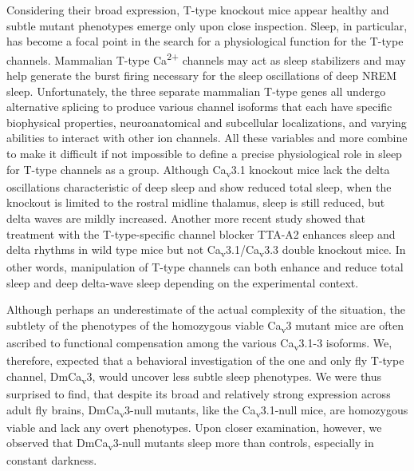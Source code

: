 Considering their broad expression, T-type knockout mice appear healthy and subtle mutant phenotypes emerge only upon close inspection.
Sleep, in particular, has become a focal point in the search for a physiological function for the T-type channels.
Mammalian T-type Ca\textsuperscript{2+} channels may act as sleep stabilizers and may help generate the burst firing necessary for the sleep oscillations of deep NREM sleep.
Unfortunately, the three separate mammalian T-type genes all undergo alternative splicing to produce various channel isoforms that each have specific biophysical properties, neuroanatomical and subcellular localizations, and varying abilities to interact with other ion channels.
All these variables and more combine to make it difficult if not impossible to define a precise physiological role in sleep for T-type channels as a group.
Although Ca\textsubscript{v}3.1 knockout mice lack the delta oscillations characteristic of deep sleep and show reduced total sleep\cite{Lee:2004ey}, when the knockout is limited to the rostral midline thalamus, sleep is still reduced, but delta waves are mildly increased\cite{anderson:2005aa}. Another more recent study showed that treatment with the T-type-specific channel blocker TTA-A2 enhances sleep and delta rhythms in wild type mice but not Ca\textsubscript{v}3.1/Ca\textsubscript{v}3.3 double knockout mice\cite{kraus:2010aa}. In other words, manipulation of T-type channels can both enhance and reduce total sleep and deep delta-wave sleep depending on the experimental context.

Although perhaps an underestimate of the actual complexity of the situation, the subtlety of the phenotypes of the homozygous viable Ca\textsubscript{v}3 mutant mice are often ascribed to functional compensation among the various Ca\textsubscript{v}3.1-3 isoforms\cite{senatore:2012aa}.
We, therefore, expected that a behavioral investigation of the one and only fly T-type channel, DmCa\textsubscript{v}3, would uncover less subtle sleep phenotypes.
We were thus surprised to find, that despite its broad and relatively strong expression across adult fly brains, DmCa\textsubscript{v}3-null mutants, like the Ca\textsubscript{v}3.1-null mice, are homozygous viable and lack any overt phenotypes.
Upon closer examination, however, we observed that DmCa\textsubscript{v}3-null mutants sleep more than controls, especially in constant darkness.

